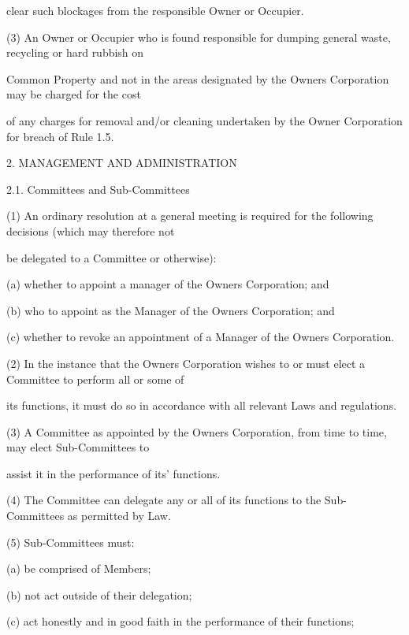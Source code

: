 \documentclass{article}
\begin{document}
{\fontsize{10.02}{1}clear such blockages from the responsible Owner or Occupier. }

{\fontsize{9.962}{1}(3) An Owner or Occupier who is found responsible for dumping general waste, recycling or hard rubbish on }

{\fontsize{10.02}{1}Common Property and not in the areas designated by the Owners Corporation may be charged for the cost }

{\fontsize{10.02}{1}of any charges for removal and/or cleaning undertaken by the Owner Corporation for breach of Rule 1.5. }

\newpage

{\fontsize{9.99}{1}2. MANAGEMENT AND ADMINISTRATION }

{\fontsize{9.99}{1}2.1. Committees and Sub-Committees }

{\fontsize{9.962}{1}(1) An ordinary resolution at a general meeting is required for the following decisions (which may therefore not }

{\fontsize{10.02}{1}be delegated to a Committee or otherwise): }

{\fontsize{9.962}{1}(a) whether to appoint a manager of the Owners Corporation; and }

{\fontsize{9.962}{1}(b) who to appoint as the Manager of the Owners Corporation; and }

{\fontsize{9.962}{1}(c) whether to revoke an appointment of a Manager of the Owners Corporation. }

{\fontsize{9.962}{1}(2) In the instance that the Owners Corporation wishes to or must elect a Committee to perform all or some of }

{\fontsize{10.02}{1}its functions, it must do so in accordance with all relevant Laws and regulations. }

{\fontsize{9.962}{1}(3) A Committee as appointed by the Owners Corporation, from time to time, may elect Sub-Committees to }

{\fontsize{10.02}{1}assist it in the performance of its’ functions. }

{\fontsize{9.962}{1}(4) The Committee can delegate any or all of its functions to the Sub-Committees as permitted by Law. }

{\fontsize{9.962}{1}(5) Sub-Committees must: }

{\fontsize{9.962}{1}(a) be comprised of Members; }

{\fontsize{9.962}{1}(b) not act outside of their delegation; }

{\fontsize{9.962}{1}(c) act honestly and in good faith in the performance of their functions; }
\end{document}
